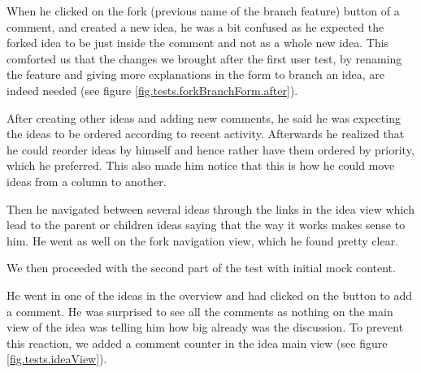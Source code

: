 \documentclass[a4paper,12pt, oneside]{article}
\begin{document}
When he clicked on the fork (previous name of the branch feature) button of a comment, and created a new idea, he was a bit confused as he expected the forked idea to be just inside the comment and not as a whole new idea.
This comforted us that the changes we brought after the first user test, by renaming the feature and giving more explanations in the form to branch an idea, are indeed needed (see figure \ref{fig.tests.forkBranchForm.after}).

After creating other ideas and adding new comments, he said he was expecting the ideas to be ordered according to recent activity.
Afterwards he realized that he could reorder ideas by himself and hence rather have them ordered by priority, which he preferred.
This also made him notice that this is how he could move ideas from a column to another.

Then he navigated between several ideas through the links in the idea view which lead to the parent or children ideas saying that the way it works makes sense to him.
He went as well on the fork navigation view, which he found pretty clear.

We then proceeded with the second part of the test with initial mock content.

He went in one of the ideas in the overview and had clicked on the button to add a comment.
He was surprised to see all the comments as nothing on the main view of the idea was telling him how big already was the discussion.
To prevent this reaction, we added a comment counter in the idea main view (see figure \ref{fig.tests.ideaView}).
\end{document}
